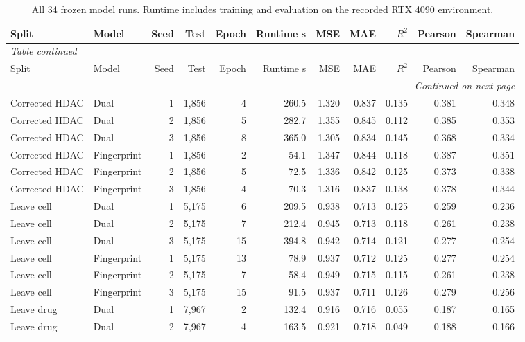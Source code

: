 \begin{landscape}
\begingroup
\scriptsize
\begin{longtable}{@{}llrrrrrrrrr@{}}
\caption{All 34 frozen model runs. Runtime includes training and evaluation on the recorded RTX 4090 environment.}\label{tab:s_runs}\\
\toprule
Split & Model & Seed & Test & Epoch & Runtime s & MSE & MAE & $R^2$ & Pearson & Spearman \\
\midrule
\endfirsthead
\multicolumn{11}{l}{\textit{Table continued}}\\
\toprule
Split & Model & Seed & Test & Epoch & Runtime s & MSE & MAE & $R^2$ & Pearson & Spearman \\
\midrule
\endhead
\midrule
\multicolumn{11}{r}{\textit{Continued on next page}}\\
\endfoot
\bottomrule
\endlastfoot
Corrected HDAC & Dual & 1 & 1,856 & 4 & 260.5 & 1.320 & 0.837 & 0.135 & 0.381 & 0.348 \\
Corrected HDAC & Dual & 2 & 1,856 & 5 & 282.7 & 1.355 & 0.845 & 0.112 & 0.385 & 0.353 \\
Corrected HDAC & Dual & 3 & 1,856 & 8 & 365.0 & 1.305 & 0.834 & 0.145 & 0.368 & 0.334 \\
Corrected HDAC & Fingerprint & 1 & 1,856 & 2 & 54.1 & 1.347 & 0.844 & 0.118 & 0.387 & 0.351 \\
Corrected HDAC & Fingerprint & 2 & 1,856 & 5 & 72.5 & 1.336 & 0.842 & 0.125 & 0.373 & 0.338 \\
Corrected HDAC & Fingerprint & 3 & 1,856 & 4 & 70.3 & 1.316 & 0.837 & 0.138 & 0.378 & 0.344 \\
Leave cell & Dual & 1 & 5,175 & 6 & 209.5 & 0.938 & 0.713 & 0.125 & 0.259 & 0.236 \\
Leave cell & Dual & 2 & 5,175 & 7 & 212.4 & 0.945 & 0.713 & 0.118 & 0.261 & 0.238 \\
Leave cell & Dual & 3 & 5,175 & 15 & 394.8 & 0.942 & 0.714 & 0.121 & 0.277 & 0.254 \\
Leave cell & Fingerprint & 1 & 5,175 & 13 & 78.9 & 0.937 & 0.712 & 0.125 & 0.277 & 0.254 \\
Leave cell & Fingerprint & 2 & 5,175 & 7 & 58.4 & 0.949 & 0.715 & 0.115 & 0.261 & 0.238 \\
Leave cell & Fingerprint & 3 & 5,175 & 15 & 91.5 & 0.937 & 0.711 & 0.126 & 0.279 & 0.256 \\
Leave drug & Dual & 1 & 7,967 & 2 & 132.4 & 0.916 & 0.716 & 0.055 & 0.187 & 0.165 \\
Leave drug & Dual & 2 & 7,967 & 4 & 163.5 & 0.921 & 0.718 & 0.049 & 0.188 & 0.166 \\

\end{longtable}
\end{landscape}
